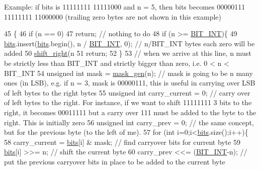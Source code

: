 Example\+: if bits is 11111111 11111000 and n = 5, then bits becomes 00000111 11111111 11000000 (trailing zero bytes are not shown in this example) 
\begin{DoxyCode}
45                                \{
46   \textcolor{keywordflow}{if} (n == 0)
47     \textcolor{keywordflow}{return}; \textcolor{comment}{// nothing to do}
48   \textcolor{keywordflow}{if} (n >= \hyperlink{bitstream_8h_afcadf5aa65c5159bfb96c4d82ebc0a5d}{BIT\_INT})\{
49     \hyperlink{classbit__pipe_a86f38af1e9736b053728033490476b50}{bits}.insert(\hyperlink{classbit__pipe_a86f38af1e9736b053728033490476b50}{bits}.begin(), n / \hyperlink{bitstream_8h_afcadf5aa65c5159bfb96c4d82ebc0a5d}{BIT\_INT}, 0); \textcolor{comment}{// n/BIT\_INT bytes each zero will be added}
50     \hyperlink{classbit__pipe_a341a1f62d728a67f730503ca722a7770}{shift\_right}(n%
51     \textcolor{keywordflow}{return};
52   \}
53   \textcolor{comment}{// when we arrive at this line, n must be strictly less than BIT\_INT and strictly bigger than zero, i.e.
       0 < n < BIT\_INT}
54   \textcolor{keywordtype}{unsigned} \textcolor{keywordtype}{int} mask = \hyperlink{bitstream_8cpp_a6364b017a9400a38f7a994376bb3ebee}{mask\_gen}(n); \textcolor{comment}{// mask is going to be n many ones (in LSB), e.g. if n = 3, mask
       is 00000111, this is useful in carrying over LSB of left bytes to the right bytes}
55   \textcolor{keywordtype}{unsigned} \textcolor{keywordtype}{int} carry\_current = 0; \textcolor{comment}{// carry over of left bytes to the right. For instance, if we want to
       shift 11111111 3 bits to the right, it becomes 00011111 but a carry over 111 must be added to the byte to the
       right. This is initially zero}
56   \textcolor{keywordtype}{unsigned} \textcolor{keywordtype}{int} carry\_prev = 0; \textcolor{comment}{// the same concept, but for the previous byte (to the left of me). }
57   \textcolor{keywordflow}{for} (\textcolor{keywordtype}{int} i=0;i<\hyperlink{classbit__pipe_a86f38af1e9736b053728033490476b50}{bits}.size();i++)\{
58     carry\_current = \hyperlink{classbit__pipe_a86f38af1e9736b053728033490476b50}{bits}[i] & mask; \textcolor{comment}{// find carryover bits for current byte}
59     \hyperlink{classbit__pipe_a86f38af1e9736b053728033490476b50}{bits}[i] >>= n; \textcolor{comment}{// shift the current byte}
60     carry\_prev <<= (\hyperlink{bitstream_8h_afcadf5aa65c5159bfb96c4d82ebc0a5d}{BIT\_INT}-n); \textcolor{comment}{// put the previous carryover bits in place to be added to the
       current byte}

\end{DoxyCode}
